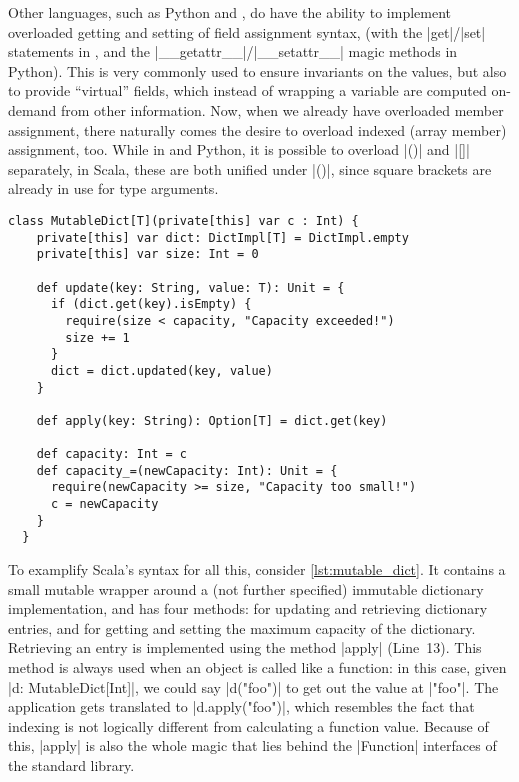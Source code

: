 Other languages, such as Python and \csharp{}, do have the ability to implement overloaded getting
and setting of field assignment syntax, (with the |get|/|set| statements in \csharp{}, and the
|__getattr__|/|__setattr__| magic methods in Python). This is very commonly used to ensure
invariants on the values, but also to provide \enquote{virtual} fields, which instead of wrapping a
variable are computed on-demand from other information. Now, when we already have overloaded member
assignment, there naturally comes the desire to overload indexed (array member) assignment,
too. While in \csharp{} and Python, it is possible to overload |()| and |[]| separately, in Scala,
these are both unified under |()|, since square brackets are already in use for type arguments.

\begin{lstlisting}[style=floating, 
  caption={A mutable wrapper around an immutable dictionary type \lstinline|DictImpl|,
    ensuring the size to stay below a fixed capacity. The capacity can be reset, but only
    increasingly~-- it always has to be bigger than the current actual size, which is ensured in the
    setter as a precondition.
    \hfill\github{dsl-examples/blob/master/src/main/scala/dsl_examples/MutableDict.scala}},
  label=lst:mutable_dict]
  class MutableDict[T](private[this] var c : Int) {
    private[this] var dict: DictImpl[T] = DictImpl.empty
    private[this] var size: Int = 0

    def update(key: String, value: T): Unit = {
      if (dict.get(key).isEmpty) {
        require(size < capacity, "Capacity exceeded!")
        size += 1
      }
      dict = dict.updated(key, value)
    }

    def apply(key: String): Option[T] = dict.get(key)

    def capacity: Int = c
    def capacity_=(newCapacity: Int): Unit = {
      require(newCapacity >= size, "Capacity too small!")
      c = newCapacity
    }
  }
\end{lstlisting}

To examplify Scala's syntax for all this, consider \autoref{lst:mutable_dict}. It contains a small
mutable wrapper around a (not further specified) immutable dictionary implementation, and has four
methods: for updating and retrieving dictionary entries, and for getting and setting the maximum
capacity of the dictionary. Retrieving an entry is implemented using the method |apply|
(Line~13). This method is always used when an object is called like a function: in this case, given
|d: MutableDict[Int]|, we could say |d("foo")| to get out the value at |"foo"|. The application gets
translated to |d.apply("foo")|, which resembles the fact that indexing is not logically different
from calculating a function value. Because of this, |apply| is also the whole magic that lies behind
the |Function| interfaces of the standard library.

